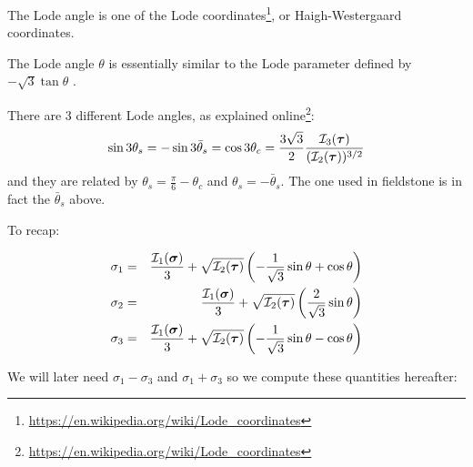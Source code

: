 \begin{remark} The Lode angle is one of the Lode 
coordinates\footnote{\url{https://en.wikipedia.org/wiki/Lode_coordinates}},
or Haigh-Westergaard coordinates. 
\end{remark}

\begin{remark} The Lode angle $\theta$ is essentially similar to the 
Lode parameter  defined by $-\sqrt{3}\tan\theta$ \cite{owhi}.
\end{remark}

\begin{remark}
There are 3 different Lode angles, as explained online\footnote{\url{https://en.wikipedia.org/wiki/Lode_coordinates}}:
\[
\sin 3\theta_s = -\sin 3 \bar{\theta}_s = \cos 3\theta_c = \frac{3\sqrt{3}}{2}\frac{{\cal I}_3({\bm \tau})}{({\cal I}_2({\bm \tau}))^{3/2}}
\]
and they are related by $\theta_s = \frac{\pi}{6}-\theta_c$ and $\theta_s = -\bar{\theta}_s$. The one used in fieldstone is in fact the $\bar{\theta}_s$ above.
\label{rq:signs}
\end{remark}

To recap:
\begin{mdframed}[backgroundcolor=blue!5]
\begin{eqnarray}
\sigma_1 &=& \frac{{\cal I}_1({\bm \sigma})}{3} + \sqrt{{\cal I}_2({\bm \tau})} \left(-\frac{1}{\sqrt{3}}\sin \theta  +\cos\theta \right) \label{eq:sigma1} \\ 
\sigma_2 &=& \frac{{\cal I}_1({\bm \sigma})}{3} + \sqrt{{\cal I}_2({\bm \tau})} \left(\frac{2}{\sqrt{3}}\sin \theta   \right)    \label{eq:sigma2} \\
\sigma_3 &=& \frac{{\cal I}_1({\bm \sigma})}{3} + \sqrt{{\cal I}_2({\bm \tau})} \left(-\frac{1}{\sqrt{3}}\sin \theta  - \cos \theta \right)    \label{eq:sigma3}
\end{eqnarray}
\end{mdframed}


We will later need $\sigma_1-\sigma_3$ and $\sigma_1+\sigma_3$ so we compute these
quantities hereafter:

